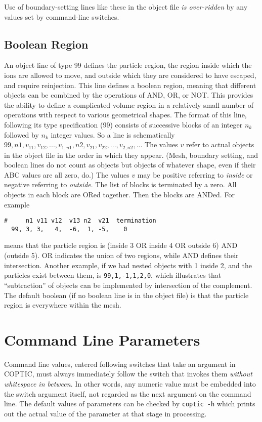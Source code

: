 \documentclass[12pt]{article}
\begin{document}
Use of boundary-setting lines like these in the object file
\emph{is over-ridden} by any values set by command-line switches.

\subsection{Boolean Region}

An object line of type 99 defines the particle region, the region
inside which the ions are allowed to move, and outside which they are
considered to have escaped, and require reinjection. This line defines
a boolean region, meaning that different objects can be combined by
the operations of AND, OR, or NOT. This provides the ability to define
a complicated volume region in a relatively small number of operations
with respect to various geometrical shapes. The format of this line,
following its type specification (99) consists of successive blocks of
an integer $n_k$ followed by $n_k$ integer values. So a line is
schematically
$99,n1,v_{11},v_{12},...,v_{1,n1},n2,v_{21},v_{22},...,v_{2,n2},...$
The values $v$ refer to actual objects in the object file in the order
in which they appear. (Mesh, boundary setting, and boolean lines do
not count as objects but objects of whatever shape, even if their ABC
values are all zero, do.)  The values $v$ may be positive referring to
\emph{inside} or negative referring to \emph{outside}. The list of
blocks is terminated by a zero. All objects in each block are ORed
together. Then the blocks are ANDed. For example
\begin{verbatim}
#     n1 v11 v12  v13 n2  v21  termination
  99, 3, 3,   4,  -6,  1, -5,    0
\end{verbatim}
means that the particle region is (inside 3 OR inside 4 OR outside 6)
AND (outside 5). OR indicates the union of two regions, while AND defines
their intersection. Another example, if we had nested objects with 1
inside 2, and the particles exist between them, is
\verb!99,1,-1,1,2,0!, which illustrates that ``subtraction'' of
objects can be implemented by intersection of the complement.  The
default boolean (if no boolean line is in the object file) is that the
particle region is everywhere within the mesh.

\section{Command Line Parameters}\label{cmdline}

Command line values, entered following switches that take an argument
in COPTIC, must always immediately follow the switch that invokes them
\emph{without whitespace in between}. In other words, any numeric
value must be embedded into the switch argument itself, not regarded
as the next argument on the command line.  The default values of
parameters can be checked by \verb!coptic -h! which prints out the
actual value of the parameter at that stage in processing.
\end{document}
